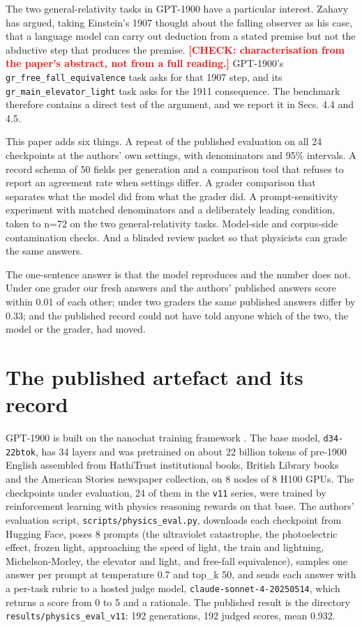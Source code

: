 \documentclass[reprint,prx,amsmath,amssymb,aps,superscriptaddress]{revtex4-2}
\begin{document}
The two general-relativity tasks in GPT-1900 have a particular interest. Zahavy \cite{ref2} has argued, taking Einstein's 1907 thought about the falling observer as his case, that a language model can carry out deduction from a stated premise but not the abductive step that produces the premise. \textbf{\textcolor{red}{[CHECK: characterisation from the paper's abstract, not from a full reading.]}} GPT-1900's \texttt{gr\_free\_fall\_equivalence} task asks for that 1907 step, and its \texttt{gr\_main\_elevator\_light} task asks for the 1911 consequence. The benchmark therefore contains a direct test of the argument, and we report it in Secs. 4.4 and 4.5.

This paper adds six things. A repeat of the published evaluation on all 24 checkpoints at the authors' own settings, with denominators and 95\% intervals. A record schema of 50 fields per generation and a comparison tool that refuses to report an agreement rate when settings differ. A grader comparison that separates what the model did from what the grader did. A prompt-sensitivity experiment with matched denominators and a deliberately leading condition, taken to n=72 on the two general-relativity tasks. Model-side and corpus-side contamination checks. And a blinded review packet so that physicists can grade the same answers.

The one-sentence answer is that the model reproduces and the number does not. Under one grader our fresh answers and the authors' published answers score within 0.01 of each other; under two graders the same published answers differ by 0.33; and the published record could not have told anyone which of the two, the model or the grader, had moved.

\section{The published artefact and its record}

GPT-1900 is built on the nanochat training framework \cite{ref13}. The base model, \texttt{d34-22btok}, has 34 layers and was pretrained on about 22 billion tokens of pre-1900 English assembled from HathiTrust institutional books, British Library books and the American Stories newspaper collection, on 8 nodes of 8 H100 GPUs. The checkpoints under evaluation, 24 of them in the \texttt{v11} series, were trained by reinforcement learning with physics reasoning rewards on that base. The authors' evaluation script, \texttt{scripts/physics\_eval.py}, downloads each checkpoint from Hugging Face, poses 8 prompts (the ultraviolet catastrophe, the photoelectric effect, frozen light, approaching the speed of light, the train and lightning, Michelson-Morley, the elevator and light, and free-fall equivalence), samples one answer per prompt at temperature 0.7 and top\_k 50, and sends each answer with a per-task rubric to a hosted judge model, \texttt{claude-sonnet-4-20250514}, which returns a score from 0 to 5 and a rationale. The published result is the directory \texttt{results/physics\_eval\_v11}: 192 generations, 192 judged scores, mean 0.932.
\end{document}
